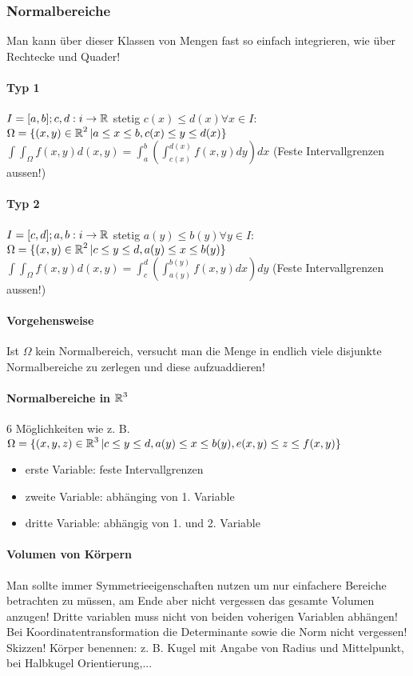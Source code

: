 \documentclass[german]{latex4ei/latex4ei_sheet}
\begin{document}
\subsubsection{Normalbereiche}
Man kann \"uber dieser Klassen von Mengen fast so einfach integrieren, wie \"uber Rechtecke und Quader!
\paragraph{Typ 1}
$I=[a,b] ; c,d: i \to \operatorname{\mathbb R}$ stetig $c(x) \le d(x) \forall x \in I$:\\
$\Omega=\{(x,y) \in \operatorname{\mathbb R}^2 | a \le x \le b, c(x) \le y \le d(x)\}$\\
$\int \int_\Omega f(x,y) d(x,y)=\int_a^b (\int_{c(x)}^{d(x)} f(x,y) d y)d x$ (Feste Intervallgrenzen aussen!)
\paragraph{Typ 2}
$I=[c,d] ; a,b: i \to \operatorname{\mathbb R}$ stetig $a(y) \le b(y) \forall y \in I$:\\
$\Omega=\{(x,y) \in \operatorname{\mathbb R}^2 | c \le y \le d, a(y) \le x \le b(y)\}$\\
$\int \int_\Omega f(x,y) d(x,y)=\int_c^d (\int_{a(y)}^{b(y)} f(x,y) d x)d y$ (Feste Intervallgrenzen aussen!)
\paragraph{Vorgehensweise}
Ist $\Omega$ kein Normalbereich, versucht man die Menge in endlich viele disjunkte Normalbereiche zu zerlegen und diese aufzuaddieren!
\paragraph{Normalbereiche in $\operatorname{\mathbb R}^3$}
6 M\"oglichkeiten wie z. B. $\Omega=\{(x,y,z) \in \operatorname{\mathbb R}^3 | c \le y \le d, a(y) \le x \le b(y), e(x,y) \le z \le f(x,y)\}$
\begin{itemize}
\item erste Variable: feste Intervallgrenzen
\item zweite Variable: abh\"anging von 1. Variable
\item dritte Variable: abh\"angig von 1. und 2. Variable
\end{itemize}

\paragraph{Volumen von K\"orpern}
Man sollte immer Symmetrieeigenschaften nutzen um nur einfachere Bereiche betrachten zu m\"ussen, am Ende aber nicht vergessen das gesamte Volumen anzugen! Dritte variablen muss nicht von beiden voherigen Variablen abh\"angen! Bei Koordinatentransformation die Determinante sowie die Norm nicht vergessen!\\
Skizzen! K\"orper benennen: z. B. Kugel mit Angabe von Radius und Mittelpunkt, bei Halbkugel Orientierung,...
\end{document}
